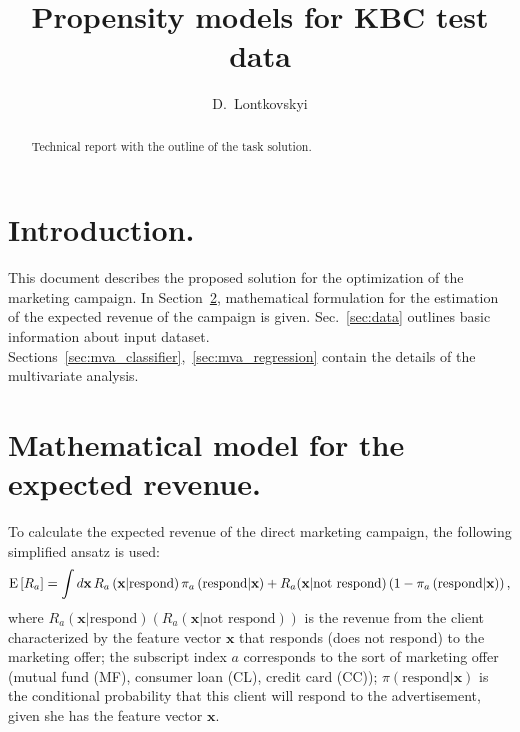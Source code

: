\documentclass[14pt]{scrartcl}
\title{Propensity models for KBC test data}
\author{D.~Lontkovskyi}
\begin{document}
\maketitle

\begin{abstract}
Technical report with the outline of the task solution.
\end{abstract}
\section{Introduction.}
This document describes the proposed solution for the optimization of the marketing
campaign. In Section~\ref{sec:math}, mathematical formulation for the estimation of the
expected revenue of the campaign is given. Sec.~\ref{sec:data} outlines basic 
information about input dataset. Sections~\ref{sec:mva_classifier},~\ref{sec:mva_regression}
contain the details of the multivariate analysis.
\section{Mathematical model for the expected revenue.}\label{sec:math}
To calculate the expected revenue of the direct marketing campaign, the following
simplified ansatz is used:
\begin{equation}
    \textmd{E}\left[R_a\right] =  \int d\mathbf{x}\,R_a \left( \textbf{x}|\textrm{respond} \right) \pi_{a}\left(\textrm{respond}|\textbf{x}\right) + 
                                                    R_a(\textbf{x}|\textrm{not respond}) \left(1 - \pi_{a}\left(\textrm{respond}|\textbf{x}\right) \right),
\end{equation}
where $R_a \left( \textbf{x}|\textrm{respond} \right) \left(R_a \left( \textbf{x}|\textrm{not respond} \right)\right)$ is the revenue from the client characterized
by the feature vector $\textbf{x}$ that responds (does not respond) 
to the marketing offer; the subscript index $a$ corresponds to the sort
of marketing offer (mutual fund (MF), consumer loan (CL), credit card (CC)); 
$\pi\left(\textrm{respond}|\textbf{x}\right)$ is the conditional probability that 
this client will respond to the advertisement, given she has the feature vector 
$\textbf{x}$.
\end{document}
